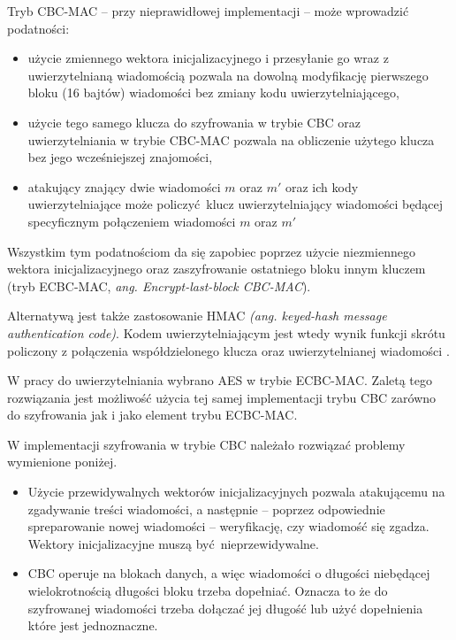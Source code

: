 Tryb CBC-MAC -- przy nieprawidłowej implementacji -- może wprowadzić podatności:

\begin{itemize}
    \item użycie zmiennego wektora inicjalizacyjnego i przesyłanie go wraz z uwierzytelnianą wiadomością pozwala na dowolną modyfikację pierwszego bloku (16 bajtów) wiadomości bez zmiany kodu uwierzytelniającego,
    \item użycie tego samego klucza do szyfrowania w trybie CBC oraz uwierzytelniania w trybie CBC-MAC pozwala na obliczenie użytego klucza bez jego wcześniejszej znajomości,
    \item atakujący znający dwie wiadomości $ m $ oraz $ m' $ oraz ich kody uwierzytelniające może policzyć klucz uwierzytelniający wiadomości będącej specyficznym połączeniem wiadomości $ m $ oraz $ m' $
\end{itemize}

Wszystkim tym podatnościom da się zapobiec poprzez użycie niezmiennego wektora inicjalizacyjnego oraz zaszyfrowanie ostatniego bloku innym kluczem (tryb ECBC-MAC, {\itshape ang. Encrypt-last-block CBC-MAC}).

Alternatywą jest także zastosowanie HMAC {\itshape (ang. keyed-hash message authentication code)}. Kodem uwierzytelniającym jest wtedy wynik funkcji skrótu policzony z połączenia współdzielonego klucza oraz uwierzytelnianej wiadomości \cite{krawczyk1997hmac}.

W pracy do uwierzytelniania wybrano AES w trybie ECBC-MAC. Zaletą tego rozwiązania jest możliwość użycia tej samej implementacji trybu CBC zarówno do szyfrowania jak i jako element trybu ECBC-MAC.

W implementacji szyfrowania w trybie CBC należało rozwiązać problemy wymienione poniżej.

\begin{itemize}
    \item Użycie przewidywalnych wektorów inicjalizacyjnych pozwala atakującemu na zgadywanie treści wiadomości, a następnie -- poprzez odpowiednie spreparowanie nowej wiadomości -- weryfikację, czy wiadomość się zgadza. Wektory inicjalizacyjne muszą być nieprzewidywalne.
    \item CBC operuje na blokach danych, a więc wiadomości o długości niebędącej wielokrotnością długości bloku trzeba dopełniać. Oznacza to że do szyfrowanej wiadomości trzeba dołączać jej długość lub użyć dopełnienia które jest jednoznaczne.
\end{itemize}

